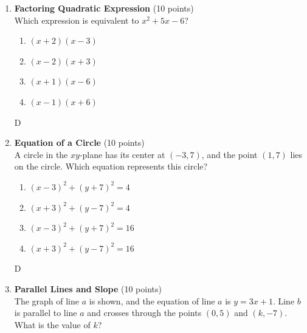 \begin{enumerate}
  \item \textbf{Factoring Quadratic Expression} (10 points)\\
  Which expression is equivalent to $x^2 + 5x - 6$?
  \begin{enumerate}[label=(\Alph*)]
    \item $(x+2)(x-3)$
    \item $(x-2)(x+3)$
    \item $(x+1)(x-6)$
    \item $(x-1)(x+6)$
  \end{enumerate}
  \begin{subanswer}
    D
  \end{subanswer}










  
  \newpage


  \item \textbf{Equation of a Circle} (10 points)\\
  A circle in the $xy$-plane has its center at $(-3,7)$, and the point $(1,7)$ lies on the circle. Which equation represents this circle?
  \begin{enumerate}[label=(\Alph*)]
    \item $(x-3)^2 + (y+7)^2 = 4$
    \item $(x+3)^2 + (y-7)^2 = 4$
    \item $(x-3)^2 + (y+7)^2 = 16$
    \item $(x+3)^2 + (y-7)^2 = 16$
  \end{enumerate}
  \begin{subanswer}
    D
  \end{subanswer}

  \item \textbf{Parallel Lines and Slope} (10 points)\\
  The graph of line $a$ is shown, and the equation of line $a$ is $y=3x+1$. Line $b$ is parallel to line $a$ and crosses through the points $(0,5)$ and $(k,-7)$. What is the value of $k$?
  \begin{subanswer}
    
  \end{subanswer}


  \newpage



\end{enumerate}
